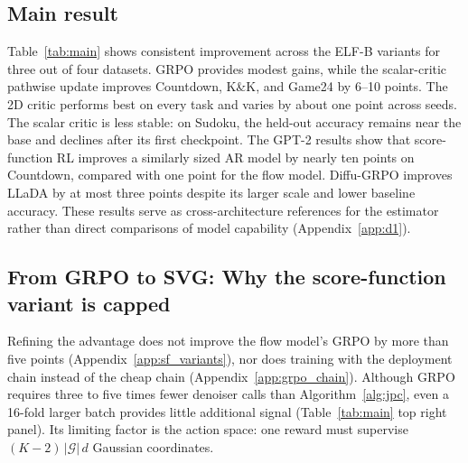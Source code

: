 \subsection{Main result}
\label{sec:exp_main}
Table~\ref{tab:main} shows consistent improvement across the ELF-B variants for three out of four datasets. GRPO provides modest gains, while the scalar-critic pathwise update improves Countdown, K\&K, and Game24 by 6--10 points. The 2D critic performs best on every task and varies by about one point across seeds. The scalar critic is less stable: on Sudoku, the held-out accuracy remains near the base and declines after its first checkpoint. The GPT-2 results show that score-function RL improves a similarly sized AR model by nearly ten points on Countdown, compared with one point for the flow model. Diffu-GRPO improves LLaDA by at most three points despite its larger scale and lower baseline accuracy. These results serve as cross-architecture references for the estimator rather than direct comparisons of model capability (Appendix~\ref{app:d1}).

\subsection{From GRPO to SVG: Why the score-function variant is capped}
\label{sec:exp_estimator}
Refining the advantage does not improve the flow model's GRPO by more than five points (Appendix~\ref{app:sf_variants}), nor does training with the deployment chain instead of the cheap chain (Appendix~\ref{app:grpo_chain}). Although GRPO requires three to five times fewer denoiser calls than Algorithm~\ref{alg:jpc}, even a 16-fold larger batch provides little additional signal (Table~\ref{tab:main} top right panel). Its limiting factor is the action space: one reward must supervise $(K-2)\,|\mathcal G|\,d$ Gaussian coordinates.

